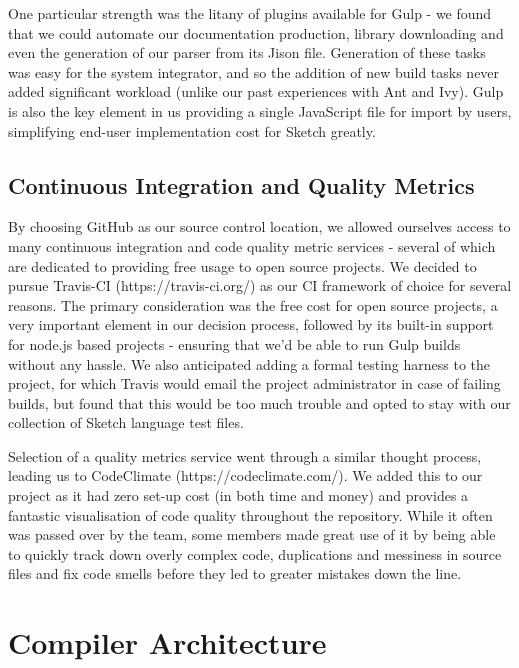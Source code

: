 \documentclass{l3proj}
\begin{document}
One particular strength was the litany of plugins available for Gulp - we found that we could automate our documentation production, library downloading and even the generation of our parser from its Jison file. Generation of these tasks was easy for the system integrator, and so the addition of new build tasks never added significant workload (unlike our past experiences with Ant and Ivy). Gulp is also the key element in us providing a single JavaScript file for import by users, simplifying end-user implementation cost for Sketch greatly.

\section{Continuous Integration and Quality Metrics}
\label{dev-ci}
By choosing GitHub as our source control location, we allowed ourselves access to many continuous integration and code quality metric services - several of which are dedicated to providing free usage to open source projects. We decided to pursue Travis-CI (https://travis-ci.org/) as our CI framework of choice for several reasons. The primary consideration was the free cost for open source projects, a very important element in our decision process, followed by its built-in support for node.js based projects - ensuring that we'd be able to run Gulp builds without any hassle. We also anticipated adding a formal testing harness to the project, for which Travis would email the project administrator in case of failing builds, but found that this would be too much trouble and opted to stay with our collection of Sketch language test files.

Selection of a quality metrics service went through a similar thought process, leading us to CodeClimate (https://codeclimate.com/). We added this to our project as it had zero set-up cost (in both time and money) and provides a fantastic visualisation of code quality throughout the repository. While it often was passed over by the team, some members made great use of it by being able to quickly track down overly complex code, duplications and messiness in source files and fix code smells before they led to greater mistakes down the line.

\chapter{Compiler Architecture}
\label{arch}
\end{document}
